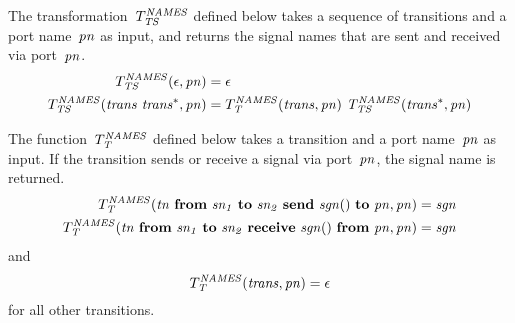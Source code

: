 The transformation~$T_{\it{TS}}^{\it{NAMES}}$ defined below takes a sequence of transitions and a port name~$\it{pn}$ as input, and returns the signal names that are sent and received via port~$\it{pn}$.
%
\begin{align*}
T_{\it{TS}}^{\it{NAMES}}(\epsilon, \it{pn}) & = \epsilon \\
T_{\it{TS}}^{\it{NAMES}}(\it{trans}~\it{trans^*}, \it{pn}) & = T_{\it{T}}^{\it{NAMES}}(\it{trans}, \it{pn})~T_{\it{TS}}^{\it{NAMES}}(\it{trans^*}, \it{pn})
\end{align*}

The function~$T_{\it{T}}^{\it{NAMES}}$ defined below takes a transition and a port name~$\it{pn}$ as input.
If the transition sends or receive a signal via port~$\it{pn}$, the signal name is returned.
%
\begin{align*}
T_{\it{T}}^{\it{NAMES}}(\it{tn}~\textbf{from}~\it{sn_1}~\textbf{to}~\it{sn_2}~\textbf{send}~\it{sgn}()~\textbf{to}~\it{pn}, \it{pn}) & = \it{sgn} \\
T_{\it{T}}^{\it{NAMES}}(\it{tn}~\textbf{from}~\it{sn_1}~\textbf{to}~\it{sn_2}~\textbf{receive}~\it{sgn}()~\textbf{from}~\it{pn}, \it{pn}) & = \it{sgn}
\end{align*}
and
\[
T_{\it{T}}^{\it{NAMES}}(\it{trans}, \it{pn}) = \epsilon
\]
for all other transitions. 